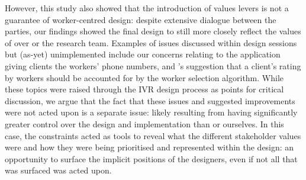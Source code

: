 However, this study also showed that the introduction of values levers is not a guarantee of worker-centred design: despite extensive dialogue between the parties, our findings showed the final design to still more closely reflect the values of \PC{} over \NGO{} or the research team. Examples of issues discussed within design sessions but (as-yet) unimplemented include our concerns relating to the application giving clients the workers' phone numbers, and \NGO{}'s suggestion that a client's rating by workers should be accounted for by the worker selection algorithm. While these topics were raised through the IVR design process as points for critical discussion, we argue that the fact that these issues and suggested improvements were not acted upon is a separate issue: likely resulting from \PC{} having significantly greater control over the design and implementation than \NGO{} or ourselves. In this case, the constraints acted as tools to reveal what the different stakeholder values were and how they were being prioritised and represented within the design: an opportunity to surface the implicit positions of the designers, even if not all that was surfaced was acted upon.



